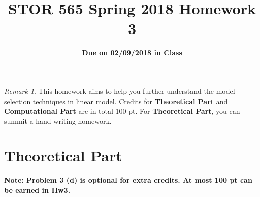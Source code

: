 \documentclass[10pt]{article}
\title{\textbf {STOR 565 Spring 2018 Homework 3}}
\subtitle{\textbf{Due on 02/09/2018 in Class}}
\author{}
\date{}
\theoremstyle{definition}
\theoremstyle{remark}
\newtheorem*{rmk}{Remark}
\begin{document}
\maketitle


\begin{rmk}
	This homework aims to help you further understand the model selection techniques in linear model. Credits for \textbf{Theoretical Part} and \textbf{Computational Part} are in total 100 pt. For \textbf{Theoretical Part}, you can summit a hand-writing homework.
\end{rmk}

\section*{Theoretical Part}
{\bf Note: Problem 3 (d) is optional for extra credits. At most 100 pt can be earned in Hw3.}
\end{document}
